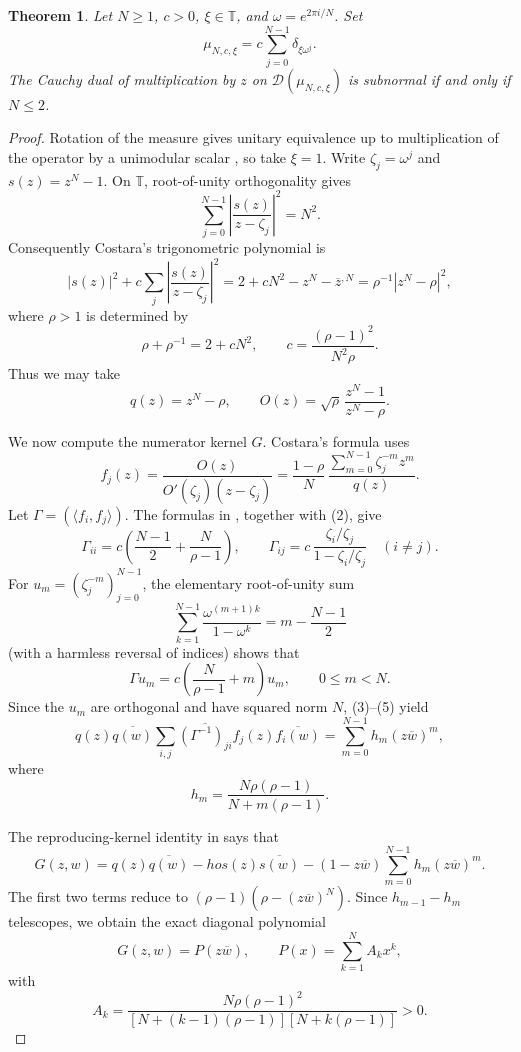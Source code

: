 \documentclass[11pt]{article}
\newtheorem{theorem}{Theorem}
\newcommand{\T}{\mathbb T}
\newcommand{\cD}{\mathscr D}
\begin{document}
\begin{theorem}\label{thm:main}
Let $N\ge1$, $c>0$, $\xi\in\T$, and $\omega=e^{2\pi i/N}$.  Set
\[
 \mu_{N,c,\xi}=c\sum_{j=0}^{N-1}\delta_{\xi\omega^j}.
\]
The Cauchy dual of multiplication by $z$ on $\cD(\mu_{N,c,\xi})$ is
subnormal if and only if $N\le2$.
\end{theorem}

\begin{proof}
Rotation of the measure gives unitary equivalence up to multiplication of the
operator by a unimodular scalar \cite[Proposition~7.1]{CGR}, so take $\xi=1$.
Write $\zeta_j=\omega^j$ and $s(z)=z^N-1$.  On $\T$, root-of-unity
orthogonality gives
\[
 \sum_{j=0}^{N-1}\left|\frac{s(z)}{z-\zeta_j}\right|^2=N^2.
\]
Consequently Costara's trigonometric polynomial is
\[
 |s(z)|^2+c\sum_j\left|\frac{s(z)}{z-\zeta_j}\right|^2
 =2+cN^2-z^N-\overline z^{,N}
 =\rho^{-1}|z^N-\rho|^2,                                      \tag{1}
\]
where $\rho>1$ is determined by
\[
 \rho+\rho^{-1}=2+cN^2,
 \qquad c=\frac{(\rho-1)^2}{N^2\rho}.                         \tag{2}
\]
Thus we may take
\[
 q(z)=z^N-\rho,\qquad
 O(z)=\sqrt\rho\,\frac{z^N-1}{z^N-\rho}.
\]

We now compute the numerator kernel $G$.  Costara's formula uses
\[
 f_j(z)=\frac{O(z)}{O'(\zeta_j)(z-\zeta_j)}
 =\frac{1-\rho}{N}\,
   \frac{\sum_{m=0}^{N-1}\zeta_j^{-m}z^m}{q(z)}.              \tag{3}
\]
Let $\Gamma=(\langle f_i,f_j\rangle)$.  The formulas in
\cite[Lemmas~4.2--4.3]{Costara}, together with (2), give
\[
 \Gamma_{ii}=c\left(\frac{N-1}{2}+\frac{N}{\rho-1}\right),
 \qquad
 \Gamma_{ij}=c\,
 \frac{\zeta_i/\zeta_j}{1-\zeta_i/\zeta_j}\quad(i\ne j).     \tag{4}
\]
For $u_m=(\zeta_j^{-m})_{j=0}^{N-1}$, the elementary root-of-unity sum
\[
 \sum_{k=1}^{N-1}\frac{\omega^{(m+1)k}}{1-\omega^k}
 =m-\frac{N-1}{2}
\]
(with a harmless reversal of indices) shows that
\[
 \Gamma u_m=c\left(\frac{N}{\rho-1}+m\right)u_m,
 \qquad 0\le m<N.                                             \tag{5}
\]
Since the $u_m$ are orthogonal and have squared norm $N$, (3)--(5) yield
\[
 q(z)\overline{q(w)}\sum_{i,j}
 \overline{(\Gamma^{-1})_{ji}}f_j(z)\overline{f_i(w)}
 =\sum_{m=0}^{N-1}h_m(z\overline w)^m,                         \tag{6}
\]
where
\[
 h_m=\frac{N\rho(\rho-1)}{N+m(\rho-1)}.                      \tag{7}
\]

The reproducing-kernel identity in \cite[Theorem~6.4]{CGR} says that
\[
 G(z,w)=q(z)\overline{q(w)}-
ho s(z)\overline{s(w)}
 -(1-z\overline w)\sum_{m=0}^{N-1}h_m(z\overline w)^m.
\]
The first two terms reduce to
$(\rho-1)(\rho-(z\overline w)^N)$.  Since
$h_{m-1}-h_m$ telescopes, we obtain the exact diagonal polynomial
\[
 G(z,w)=P(z\overline w),\qquad
 P(x)=\sum_{k=1}^N A_kx^k,                                    \tag{8}
\]
with
\[
 A_k=\frac{N\rho(\rho-1)^2}
 {[N+(k-1)(\rho-1)][N+k(\rho-1)]}>0.                         \tag{9}
\]


\end{proof}
\end{document}
